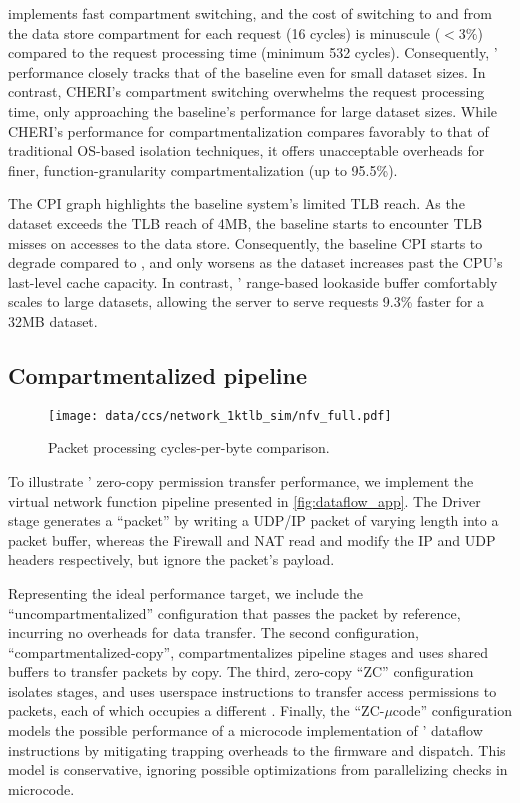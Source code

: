 \seccells implements fast compartment switching, and 
the cost of switching to and from the data store compartment
for each request (16 cycles) is minuscule ($< 3\%$) compared to the
request processing time (minimum 532 cycles).
Consequently, \seccells' performance closely tracks that of 
the baseline even for small dataset sizes.
In contrast, CHERI's compartment switching overwhelms the
request processing time, only approaching the baseline's
performance for large dataset sizes.
While CHERI's performance for compartmentalization compares
favorably to that of traditional OS-based isolation 
techniques, it offers unacceptable overheads for finer, 
function-granularity compartmentalization (up to 95.5\%).

The CPI graph highlights the baseline system's limited TLB 
reach.
As the dataset exceeds the TLB reach of 4MB, the baseline starts
to encounter TLB misses on accesses to the data store.
Consequently, the baseline CPI starts to degrade compared to
\seccells, and only worsens as the dataset increases past the
CPU's last-level cache capacity.
In contrast, \seccells' range-based lookaside buffer comfortably
scales to large datasets, allowing the  server to
serve requests 9.3\% faster for a 32MB dataset.
 
\subsection{Compartmentalized pipeline}

\begin{figure}
  \centering
  \texttt{[image: data/ccs/network\_1ktlb\_sim/nfv\_full.pdf]}
  \caption{Packet processing cycles-per-byte comparison.}
  \label{fig:nfv_cpb}
\end{figure}

To illustrate \seccells' zero-copy permission transfer performance,
we implement the virtual network function pipeline presented in
\autoref{fig:dataflow_app}.
The Driver stage generates a ``packet'' by writing a UDP/IP packet
of varying length into a packet buffer, whereas 
the Firewall and NAT read and modify the IP and UDP headers
respectively, but ignore the packet's payload.

Representing the ideal performance target,  we include the
``uncompartmentalized'' configuration that passes the packet by 
reference, incurring no overheads for data transfer.
The second configuration, ``compartmentalized-copy'', 
compartmentalizes pipeline stages and uses shared buffers to transfer
packets by copy.
The third, zero-copy ``\seccells ZC''  configuration isolates
stages, and uses userspace instructions to transfer 
access permissions to packets, each of which occupies a
different \cell{}.
Finally, the ``\seccells ZC-$\mu$code'' configuration models the 
possible performance of a microcode implementation of \seccells' 
dataflow instructions by mitigating trapping overheads
to the firmware and dispatch.
This model is conservative, ignoring possible optimizations from
parallelizing checks in microcode.

